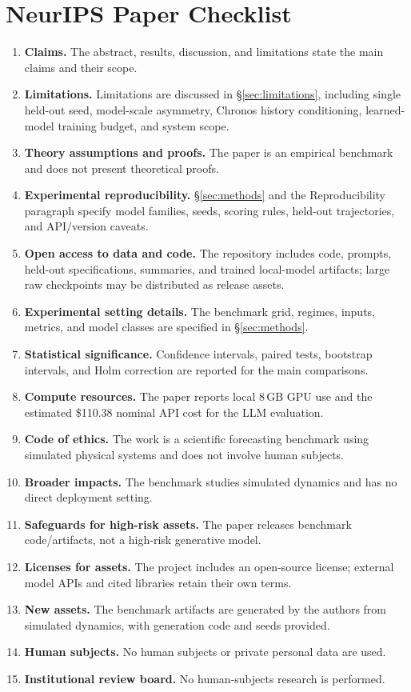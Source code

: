 \documentclass{article}
\begin{document}
\section*{NeurIPS Paper Checklist}
\begin{enumerate}[leftmargin=1.4em,itemsep=2pt,topsep=2pt]
\item \textbf{Claims.} \answerYes{} The abstract, results, discussion, and limitations state
the main claims and their scope.
\item \textbf{Limitations.} \answerYes{} Limitations are discussed in \S\ref{sec:limitations},
including single held-out seed, model-scale asymmetry, Chronos history conditioning, learned-model
training budget, and system scope.
\item \textbf{Theory assumptions and proofs.} \answerNA{} The paper is an empirical benchmark
and does not present theoretical proofs.
\item \textbf{Experimental reproducibility.} \answerYes{} \S\ref{sec:methods} and the
Reproducibility paragraph specify model families, seeds, scoring rules, held-out trajectories,
and API/version caveats.
\item \textbf{Open access to data and code.} \answerYes{} The repository includes code,
prompts, held-out specifications, summaries, and trained local-model artifacts; large raw
checkpoints may be distributed as release assets.
\item \textbf{Experimental setting details.} \answerYes{} The benchmark grid, regimes,
inputs, metrics, and model classes are specified in \S\ref{sec:methods}.
\item \textbf{Statistical significance.} \answerYes{} Confidence intervals, paired tests,
bootstrap intervals, and Holm correction are reported for the main comparisons.
\item \textbf{Compute resources.} \answerYes{} The paper reports local 8\,GB GPU use and
the estimated \$110.38 nominal API cost for the LLM evaluation.
\item \textbf{Code of ethics.} \answerYes{} The work is a scientific forecasting benchmark
using simulated physical systems and does not involve human subjects.
\item \textbf{Broader impacts.} \answerNA{} The benchmark studies simulated dynamics and has
no direct deployment setting.
\item \textbf{Safeguards for high-risk assets.} \answerNA{} The paper releases benchmark
code/artifacts, not a high-risk generative model.
\item \textbf{Licenses for assets.} \answerYes{} The project includes an open-source license;
external model APIs and cited libraries retain their own terms.
\item \textbf{New assets.} \answerYes{} The benchmark artifacts are generated by the authors
from simulated dynamics, with generation code and seeds provided.
\item \textbf{Human subjects.} \answerNA{} No human subjects or private personal data are used.
\item \textbf{Institutional review board.} \answerNA{} No human-subjects research is performed.
\end{enumerate}
\end{document}
